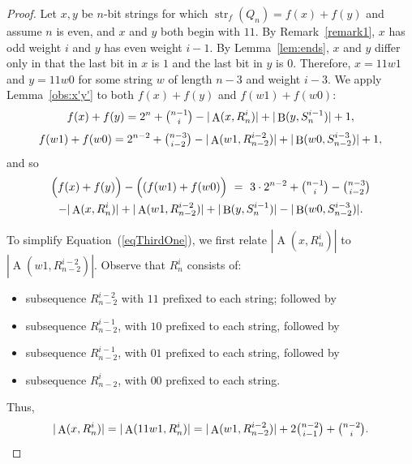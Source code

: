 \documentclass[12pt]{article}
\DeclareMathOperator{\str}{str}
\DeclareMathOperator{\Succ}{A}
\DeclareMathOperator{\Prec}{B}
\begin{document}
\begin{proof} Let $x,y$ be $n$-bit strings for which $\str_f(Q_{n}) = f(x)+f(y)$ and assume $n$ is even, and $x$ and $y$ both begin with $11$.  By Remark~\ref{remark1}, $x$ has odd weight $i$ and $y$ has even weight $i-1$.  By Lemma~\ref{lem:ends}, $x$ and $y$ differ only in that the last bit in $x$ is $1$ and the last bit in $y$ is $0$.  Therefore, $x = 11w1$ and $y=11w0$ for some string $w$ of length $n-3$ and weight $i-3$. We apply Lemma~\ref{obs:x'y'} to both $f(x)+f(y)$ and $f(w1)+f(w0)$: 
$$f(x)+f(y) = 2^{n}+ \tbinom{n-1}{i} - |\Succ(x,R_{n}^i)|+|\Prec(y,S_{n}^{i-1})|+1,$$
$$f(w1)+ f(w0) = 2^{n-2} + \tbinom{n-3}{i-2}-|\Succ(w1,R_{n-2}^{i-2})|+|\Prec(w0,S_{n-2}^{i-3})|+1,$$ and so \begin{multline}\Big(f(x)+f(y)\Big) - \Big((f(w1)+f(w0)\Big) ~=~ 3 \cdot 2^{n-2} + \tbinom{n-1}{i}-\tbinom{n-3}{i-2} \\ -|\Succ(x,R_{n}^i)|+|\Succ(w1,R_{n-2}^{i-2})|+|\Prec(y,S_{n}^{i-1})|-|\Prec(w0,S_{n-2}^{i-3})|.\label{eqThirdOne}\end{multline}

To simplify Equation~(\ref{eqThirdOne}), we first relate $|\Succ(x,R_{n}^i)|$ to $|\Succ(w1,R_{n-2}^{i-2})|$.  Observe that $R_{n}^i$ consists of:
\begin{itemize} 
\item subsequence $R_{n-2}^{i-2}$ with $11$ prefixed to each string; followed by\vspace{-0.09in}
\item subsequence $R_{n-2}^{i-1}$, with $10$ prefixed to each string, followed by \vspace{-0.09in}
\item subsequence $R_{n-2}^{i-1}$, with $01$ prefixed to each string, followed by \vspace{-0.09in} 
\item subsequence $R_{n-2}^i$, with $00$ prefixed to each string.\end{itemize} Thus, \begin{equation}\label{eqFirstOne}|\Succ(x,R_{n}^i)| = |\Succ(11w1,R_{n}^i)| =  |\Succ(w1,R_{n-2}^{i-2})| + 2\tbinom{n-2}{i-1}+\tbinom{n-2}{i}.\end{equation}  



\end{proof}
\end{document}
